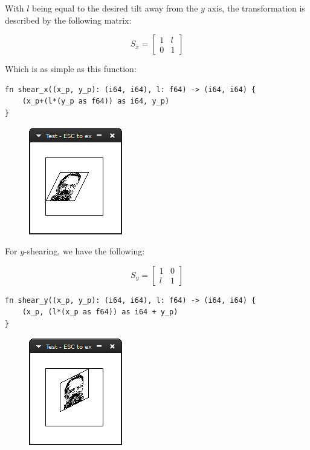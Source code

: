 \documentclass[12pt,openany,a4,usenames,dvipsnames]{book}
\begin{document}
With $l$ being equal to the desired tilt away from the $y$ axis, the transformation is described by the following matrix:

\[
  S_x =
  \begin{bmatrix}
    1 & l\\
    0 & 1
  \end{bmatrix}
\]

Which is as simple as this function:

\begin{verbatim}
fn shear_x((x_p, y_p): (i64, i64), l: f64) -> (i64, i64) {
    (x_p+(l*(y_p as f64)) as i64, y_p)
}
\end{verbatim}

\begin{figure}[H]
\centering
\includegraphics{figures/shearing-1.png}
\end{figure}

For $y$-shearing, we have the following:

\[
  S_y =
  \begin{bmatrix}
    1 & 0\\
    l & 1
  \end{bmatrix}
\]

\begin{verbatim}
fn shear_y((x_p, y_p): (i64, i64), l: f64) -> (i64, i64) {
    (x_p, (l*(x_p as f64)) as i64 + y_p)
}
\end{verbatim}

\begin{figure}[H]
\centering
\includegraphics{figures/shearing-2.png}
\end{figure}
\end{document}

